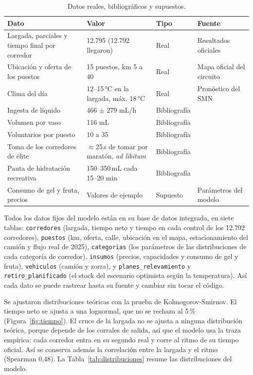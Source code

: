 \documentclass[11pt,a4paper]{article}
\begin{document}
\begin{table}[H]
\centering
\small
\begin{tabular}{P{5cm}P{3.6cm}P{2.1cm}P{4.2cm}}
\toprule
\textbf{Dato} & \textbf{Valor} & \textbf{Tipo} & \textbf{Fuente} \\
\midrule
Largada, parciales y tiempo final por corredor & 12.795 (12.792 llegaron) & Real & Resultados oficiales \cite{raceresult} \\
Ubicación y oferta de los puestos & 15 puestos, km 5 a 40 & Real & Mapa oficial del circuito \\
Clima del día & 12--15\,°C en la largada, máx. 18\,°C & Real & Pronóstico del SMN \cite{smn} \\
Ingesta de líquido & 466 $\pm$ 279 mL/h & Bibliografía & \cite{jimenez} \\
Volumen por vaso & 116 mL & Bibliografía & \cite{cheuvront} \\
Voluntarios por puesto & 10 a 35 & Bibliografía & \cite{vermont} \\
Toma de los corredores de élite & $\approx$25\,s de tomar por maratón, \emph{ad libitum} & Bibliografía & \cite{beis} \\
Pauta de hidratación recreativa & 150--350\,mL cada 15--20 min & Bibliografía & \cite{acsm} \\
Consumo de gel y fruta, precios & Valores de ejemplo & Supuesto & Parámetros del modelo \\
\bottomrule
\end{tabular}
\caption{Datos reales, bibliográficos y supuestos.}
\label{tab:datos}
\end{table}

Todos los datos fijos del modelo están en su base de datos integrada, en siete tablas: \texttt{corredores} (largada, tiempo neto y tiempo en cada control de los 12.792 corredores), \texttt{puestos} (km, oferta, calle, ubicación en el mapa, estacionamiento del camión y flujo real de 2025), \texttt{categorias} (los parámetros de las distribuciones de cada categoría de corredor), \texttt{insumos} (precios, capacidades y consumo de gel y fruta), \texttt{vehiculos} (camión y zorra), y \texttt{planes\_relevamiento} y \texttt{retiro\_planificado} (el stock del escenario optimista según la temperatura). Así cada dato se puede rastrear hasta su fuente y cambiar sin tocar el código.

Se ajustaron distribuciones teóricas con la prueba de Kolmogorov-Smirnov. El tiempo neto se ajusta a una lognormal, que no se rechaza al 5\,\% (Figura~\ref{fig:tiempo}). El cruce de la largada no se ajusta a ninguna distribución teórica, porque depende de los corrales de salida, así que el modelo usa la traza empírica: cada corredor entra en su segundo real y corre al ritmo de su tiempo oficial. Así se conserva además la correlación entre la largada y el ritmo (Spearman 0,48). La Tabla~\ref{tab:distribuciones} resume las distribuciones del modelo.
\end{document}

